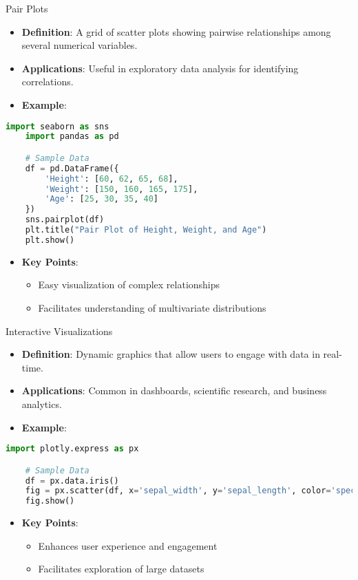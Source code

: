 \documentclass[aspectratio=169]{beamer}
\begin{document}
\begin{frame}[fragile]{Pair Plots}
    \begin{itemize}
        \item \textbf{Definition}: A grid of scatter plots showing pairwise relationships among several numerical variables.
        \item \textbf{Applications}: Useful in exploratory data analysis for identifying correlations.
        \item \textbf{Example}: 
    \end{itemize}

    \begin{lstlisting}[language=Python]
    import seaborn as sns
    import pandas as pd

    # Sample Data
    df = pd.DataFrame({
        'Height': [60, 62, 65, 68],
        'Weight': [150, 160, 165, 175],
        'Age': [25, 30, 35, 40]
    })
    sns.pairplot(df)
    plt.title("Pair Plot of Height, Weight, and Age")
    plt.show()
    \end{lstlisting}
    
    \begin{itemize}
        \item \textbf{Key Points}:
        \begin{itemize}
            \item Easy visualization of complex relationships
            \item Facilitates understanding of multivariate distributions
        \end{itemize}
    \end{itemize}
\end{frame}

\begin{frame}[fragile]{Interactive Visualizations}
    \begin{itemize}
        \item \textbf{Definition}: Dynamic graphics that allow users to engage with data in real-time.
        \item \textbf{Applications}: Common in dashboards, scientific research, and business analytics.
        \item \textbf{Example}: 
    \end{itemize}

    \begin{lstlisting}[language=Python]
    import plotly.express as px

    # Sample Data
    df = px.data.iris()
    fig = px.scatter(df, x='sepal_width', y='sepal_length', color='species')
    fig.show()
    \end{lstlisting}

    \begin{itemize}
        \item \textbf{Key Points}:
        \begin{itemize}
            \item Enhances user experience and engagement
            \item Facilitates exploration of large datasets
        \end{itemize}
    \end{itemize}
\end{frame}
\end{document}
